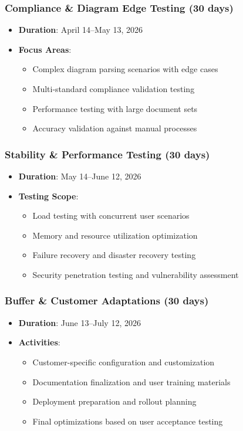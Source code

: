 \documentclass[12pt]{report}
\begin{document}
\subsubsection{Compliance \& Diagram Edge Testing (30 days)}
\begin{itemize}
  \item \textbf{Duration}: April 14--May 13, 2026
  \item \textbf{Focus Areas}:
    \begin{itemize}
      \item Complex diagram parsing scenarios with edge cases
      \item Multi-standard compliance validation testing
      \item Performance testing with large document sets
      \item Accuracy validation against manual processes
    \end{itemize}
\end{itemize}

\subsubsection{Stability \& Performance Testing (30 days)}
\begin{itemize}
  \item \textbf{Duration}: May 14--June 12, 2026
  \item \textbf{Testing Scope}:
    \begin{itemize}
      \item Load testing with concurrent user scenarios
      \item Memory and resource utilization optimization
      \item Failure recovery and disaster recovery testing
      \item Security penetration testing and vulnerability assessment
    \end{itemize}
\end{itemize}

\subsubsection{Buffer \& Customer Adaptations (30 days)}
\begin{itemize}
  \item \textbf{Duration}: June 13--July 12, 2026
  \item \textbf{Activities}:
    \begin{itemize}
      \item Customer-specific configuration and customization
      \item Documentation finalization and user training materials
      \item Deployment preparation and rollout planning
      \item Final optimizations based on user acceptance testing
    \end{itemize}
\end{itemize}
\end{document}
